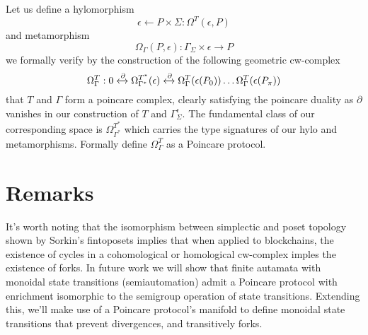 \documentclass{article}
\begin{document}
Let us define a hylomorphism
\begin{equation} \label{eq1}
\epsilon \leftarrow P \times \Sigma  : \Omega^T(\epsilon, P)
\end{equation} \label{eq1}
and metamorphism
\begin{equation} \label{eq1}
\Omega_\Gamma(P, \epsilon):\Gamma_\Sigma \times \epsilon \rightarrow P  
\end{equation} \label{eq1}
we formally verify by the construction of the following geometric cw-complex
\begin{equation} \label{eq1}
\Omega^T_\Gamma: 0 \xleftrightarrow{\partial} \Omega^{T^*}_{\Gamma^*}(\epsilon) \xleftrightarrow{\partial}  \Omega^T_\Gamma (\epsilon(P_0)) \dots \Omega^T_\Gamma (\epsilon(P_\pi))
\end{equation} \label{eq1}
that $T$ and $\Gamma$ form a poincare complex, clearly satisfying the poincare duality as $\partial$ vanishes in our construction of $T$ and $\Gamma^\epsilon_\Sigma$. The fundamental class of our corresponding space is $\Omega^{T^*}_{\Gamma^*}$ which carries the type signatures of our hylo and metamorphisms. Formally define $\Omega^{T}_{\Gamma}$  as a Poincare protocol.

\section{Remarks} 
It's worth noting that the isomorphism between simplectic and poset topology shown by Sorkin's fintoposets implies that when applied to blockchains, the existence of cycles in a cohomological or homological cw-complex imples the existence of forks. In future work we will show that finite autamata with monoidal state transitions (semiautomation) admit a Poincare protocol with enrichment isomorphic to the semigroup operation of state transitions. Extending this, we'll make use of a Poincare protocol's manifold to define monoidal state transitions that prevent divergences, and transitively forks.


\end{document}
